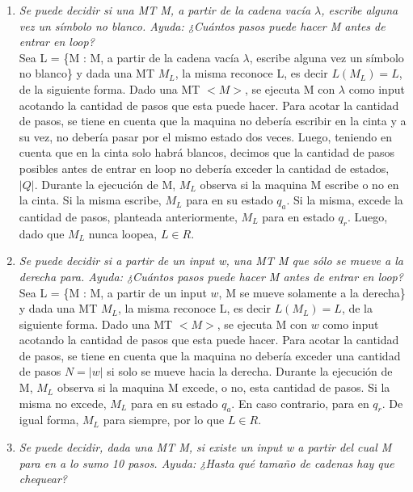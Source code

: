 \documentclass[lnbip]{svmultln}
\begin{document}
\begin{enumerate}
    \item \textit{Se puede decidir si una MT M, a partir de la cadena vacía $\lambda$, escribe alguna vez un símbolo no blanco. Ayuda: ¿Cuántos pasos puede hacer M antes de entrar en loop?} \\
    
    Sea L = \{M : M, a partir de la cadena vacía $\lambda$, escribe alguna vez un símbolo no blanco\} y dada una MT $M_L$, la misma reconoce L, es decir $L(M_{L}) = L$, de la siguiente forma. Dado una MT $<M>$, se ejecuta M con $\lambda$ como input acotando la cantidad de pasos que esta puede hacer. Para acotar la cantidad de pasos, se tiene en cuenta que la maquina no debería escribir en la cinta y a su vez, no debería pasar por el mismo estado dos veces. Luego, teniendo en cuenta que en la cinta solo habrá blancos, decimos que la cantidad de pasos posibles antes de entrar en loop no debería exceder la cantidad de estados, $|Q|$. Durante la ejecución de M, $M_L$ observa si la maquina M escribe o no en la cinta. Si la misma escribe, $M_L$ para en su estado $q_a$. Si la misma, excede la cantidad de pasos, planteada anteriormente, $M_L$ para en estado $q_r$. Luego, dado que $M_L$ nunca loopea, $L \in R$.  \\
    
    \item \textit{Se puede decidir si a partir de un input w, una MT M que sólo se mueve a la derecha para. Ayuda: ¿Cuántos pasos puede hacer M antes de entrar en loop?} \\
    
    Sea L = \{M : M, a partir de un input $w$, M se mueve solamente a la derecha\} y dada una MT $M_L$, la misma reconoce L, es decir $L(M_{L}) = L$, de la siguiente forma. Dado una MT $<M>$, se ejecuta M con $w$ como input acotando la cantidad de pasos que esta puede hacer. Para acotar la cantidad de pasos, se tiene en cuenta que la maquina no debería exceder una cantidad de pasos $N = |w|$ si solo se mueve hacia la derecha. Durante la ejecución de M, $M_L$ observa si la maquina M excede, o no, esta cantidad de pasos. Si la misma no excede, $M_L$ para en su estado $q_a$. En caso contrario, para en $q_r$. De igual forma, $M_L$ para siempre, por lo que $L \in R$. \\
    
    \item \textit{Se puede decidir, dada una MT M, si existe un input w a partir del cual M para en a lo sumo 10 pasos. Ayuda: ¿Hasta qué tamaño de cadenas hay que chequear?} \\
    

\end{enumerate}
\end{document}
